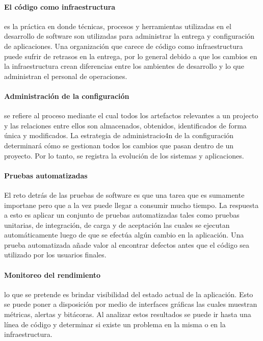 \documentclass[journal]{IEEEtran}
\begin{document}
\paragraph{El código como infraestructura} es la práctica en donde técnicas, procesos y herramientas utilizadas en el desarrollo de software son utilizadas para administrar la entrega y configuración de aplicaciones. Una organización que carece de código como infraestructura puede sufrir de retrasos en la entrega, por lo general debido a que los cambios en la infraestructura crean diferencias entre los ambientes de desarrollo y lo que administran el personal de operaciones\cite{humble}.

\paragraph{Administración de la configuración} se refiere al proceso mediante el cual todos los artefactos relevantes a un projecto y las relaciones entre ellos son almacenados, obtenidos, identificados de forma única y modificados. La estrategia de administracio4n de la configuración determinará cómo se gestionan todos los cambios que pasan dentro de un proyecto. Por lo tanto, se registra la evolución de los sistemas y aplicaciones\cite{humble}.

\paragraph{Pruebas automatizadas} El reto detrás de las pruebas de software es que una tarea que es sumamente importane pero que a la vez puede llegar a consumir mucho tiempo. La respuesta a esto es aplicar un conjunto de pruebas automatizadas tales como pruebas unitarias, de integración, de carga y de aceptación las cuales se ejecutan automáticamente luego de que se efectúa algún cambio en la aplicación. Una prueba automatizada añade valor al encontrar defectos antes que el código sea utilizado por los usuarios finales\cite{humble}.

\paragraph{Monitoreo del rendimiento} lo que se pretende es brindar visibilidad del estado actual de la aplicación. Esto se puede poner a disposición por medio de interfaces gráficas las cuales muestran métricas, alertas y bitácoras. Al analizar estos resultados se puede ir hasta una línea de código y determinar si existe un problema en la misma o en la infraestructura\cite{humble}.
\end{document}
